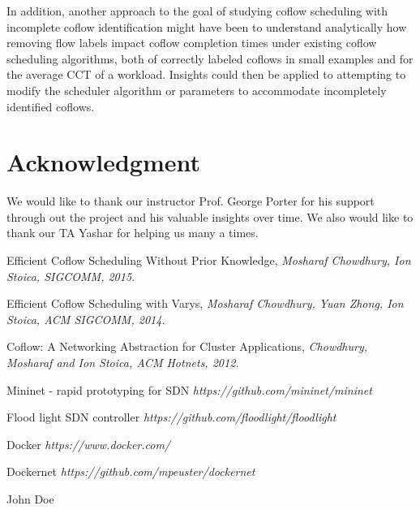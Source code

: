 \documentclass[conference]{IEEEtran}
\begin{document}
In addition, another approach to the goal of studying coflow scheduling with incomplete coflow identification might have been to understand analytically how removing flow labels impact coflow completion times under existing coflow scheduling algorithms, both of correctly labeled coflows in small examples and for the average CCT of a workload. Insights could then be applied to attempting to modify the scheduler algorithm or parameters to accommodate incompletely identified coflows.

\section*{Acknowledgment}
We would like to thank our instructor Prof. George Porter for his support through out the project and his valuable insights over time. We also would like to thank our TA Yashar for helping us many a times. 

\begin{thebibliography}{99}

Efficient Coflow Scheduling Without Prior Knowledge, 
\textit{Mosharaf Chowdhury, Ion Stoica, SIGCOMM, 2015.}

Efficient Coflow Scheduling with Varys, 
\textit{Mosharaf Chowdhury, Yuan Zhong, Ion Stoica, ACM SIGCOMM, 2014.}

Coflow: A Networking Abstraction for Cluster Applications, 
\textit{Chowdhury, Mosharaf and Ion Stoica, ACM Hotnets, 2012.}

Mininet - rapid prototyping for SDN
\textit{https://github.com/mininet/mininet}

Flood light SDN controller
\textit{https://github.com/floodlight/floodlight}

Docker
\textit{https://www.docker.com/}

Dockernet
\textit{https://github.com/mpeuster/dockernet}

\end{thebibliography}


\begin{IEEEbiography}{John Doe}
\blindtext
\end{IEEEbiography}
\end{document}

